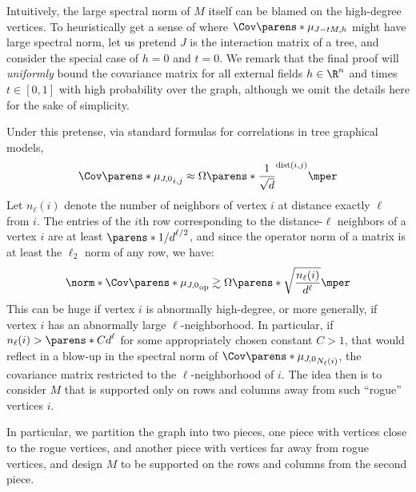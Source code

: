 \documentclass[11pt,letterpaper]{article}
\begin{document}
Intuitively, the large spectral norm of $M$ itself can be blamed on the high-degree vertices.
To heuristically get a sense of where $\Cov\parens*{\mu_{J-tM,h}}$ might have large spectral norm, let us pretend $J$ is the interaction matrix of a tree, and consider the special case of $h=0$ and $t=0$. 
We remark that the final proof will \emph{uniformly} bound the covariance matrix for all external fields $h \in \R^n$ and times $t \in [0,1]$ with high probability over the graph, although we omit the details here for the sake of simplicity.

Under this pretense, via standard formulas for correlations in tree graphical models,
\[
    \Cov\parens*{\mu_{J,0}}_{i,j}\approx\Omega\parens*{\frac{1}{\sqrt{d}}}^{\mathrm{dist}(i,j)}\mper
\]
Let $n_{\ell}(i)$ denote the number of neighbors of vertex $i$ at distance exactly $\ell$ from $i$.
The entries of the $i$th row corresponding to the distance-$\ell$ neighbors of a vertex $i$ are at least $\parens*{1/d}^{\ell/2}$, and since the operator norm of a matrix is at least the $\ell_2$ norm of any row, we have:
\[
    \norm*{\Cov\parens*{\mu_{J,0}}}_{\mathrm{op}} \gtrsim \Omega\parens*{\sqrt{\frac{n_{\ell}(i)}{d^{\ell}}}}\mper
\]
This can be huge if vertex $i$ is abnormally high-degree, or more generally, if vertex $i$ has an abnormally large $\ell$-neighborhood.
In particular, if $n_{\ell}(i) > \parens*{Cd}^{\ell}$ for some appropriately chosen constant $C > 1$, that would reflect in a blow-up in the spectral norm of $\Cov\parens*{\mu_{J,0}}_{N_{\ell}(i)}$, the covariance matrix restricted to the $\ell$-neighborhood of $i$.
The idea then is to consider $M$ that is supported only on rows and columns away from such ``rogue'' vertices $i$.

In particular, we partition the graph into two pieces, one piece with vertices close to the rogue vertices, and another piece with vertices far away from rogue vertices, and design $M$ to be supported on the rows and columns from the second piece.
\end{document}
